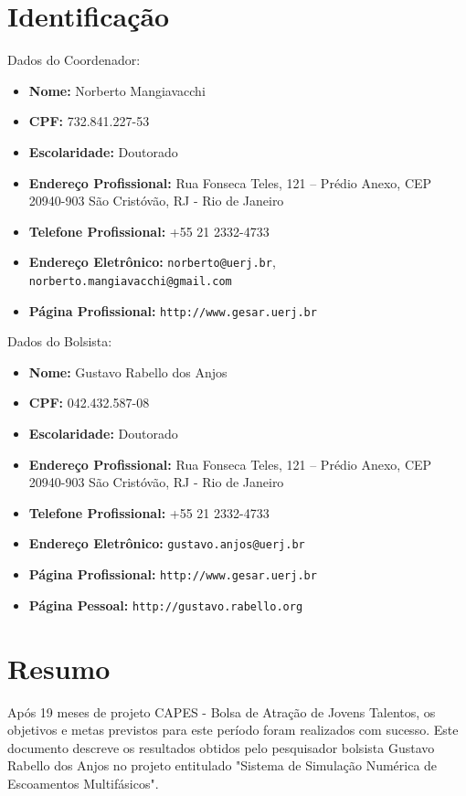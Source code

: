 \documentclass[a4paper,portuges,12pt]{article}
\begin{document}
	


\section{Identificação}

\noindent Dados do Coordenador: 
\begin{itemize}
	\item \textbf{Nome:} Norberto Mangiavacchi
	\item \textbf{CPF:} 732.841.227-53
	\item \textbf{Escolaridade:} Doutorado
	\item \textbf{Endereço Profissional:} Rua Fonseca Teles, 121 --
	Prédio Anexo, CEP 20940-903 São Cristóvão, RJ - Rio de Janeiro
	\item \textbf{Telefone Profissional:} +55 21 2332-4733
	\item \textbf{Endereço Eletrônico:} {\tt norberto@uerj.br}, 
	                                    {\tt norberto.mangiavacchi@gmail.com}
	\item \textbf{Página Profissional:} {\tt http://www.gesar.uerj.br}
\end{itemize}

\hspace{1cm}

\noindent Dados do Bolsista: 
\begin{itemize}
	\item \textbf{Nome:} Gustavo Rabello dos Anjos
	\item \textbf{CPF:} 042.432.587-08
	\item \textbf{Escolaridade:} Doutorado
	\item \textbf{Endereço Profissional:} Rua Fonseca Teles, 121 --
	Prédio Anexo, CEP 20940-903 São Cristóvão, RJ - Rio de Janeiro
	\item \textbf{Telefone Profissional:} +55 21 2332-4733
	\item \textbf{Endereço Eletrônico:} {\tt gustavo.anjos@uerj.br}
	\item \textbf{Página Profissional:} {\tt http://www.gesar.uerj.br}
	\item \textbf{Página Pessoal:} {\tt http://gustavo.rabello.org}
\end{itemize}

\clearpage

\section{Resumo}
Após 19 meses de projeto CAPES - Bolsa de Atração de Jovens
Talentos, os objetivos e metas previstos para este período foram
realizados com sucesso. Este documento descreve os resultados obtidos
pelo pesquisador bolsista Gustavo Rabello dos Anjos no projeto
entitulado "Sistema de Simulação Numérica de Escoamentos Multifásicos". 
\clearpage
\end{document}
